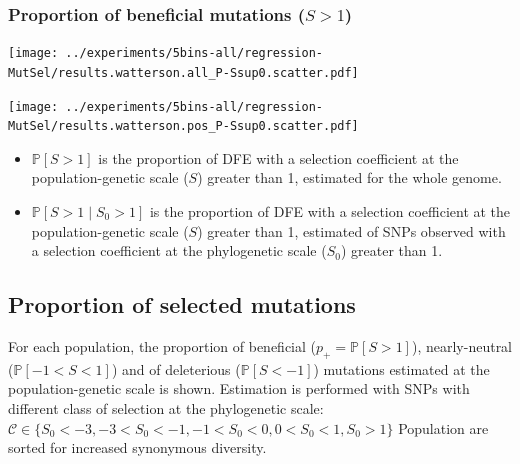 \documentclass{article}
\newcommand{\proba}{\mathbb{P}}
\newcommand{\Sphy}{S_{0}}
\newcommand{\Sphyclass}{\mathcal{C}}
\newcommand{\divStrongDel}{\Sphy < -3}
\newcommand{\divDel}{-3 < \Sphy < -1}
\newcommand{\divWeakDel}{-1 < \Sphy < 0}
\newcommand{\divWeakAdv}{0 < \Sphy < 1}
\newcommand{\divAdv}{ \Sphy > 1}
\newcommand{\given}{\mid}
\newcommand{\Spop}{S}
\newcommand{\polyDel}{\Spop < -1}
\newcommand{\polyNeutral}{-1 < \Spop < 1}
\newcommand{\polyAdv}{ \Spop > 1}
\newcommand{\PpolyDel}{\proba \left[ \polyDel \right]}
\newcommand{\PpolyNeutral}{\proba \left[ \polyNeutral \right]}
\newcommand{\PpolyAdv}{\proba \left[ \polyAdv \right]}
\begin{document}
    \subsubsection{Proportion of beneficial mutations ($\polyAdv$)}\label{subsec:proportion-beneficial-mutations}
    \begin{minipage}{0.32\linewidth}
        \texttt{[image: ../experiments/5bins-all/regression-MutSel/results.watterson.all\_P-Ssup0.scatter.pdf]}
    \end{minipage}
    \begin{minipage}{0.32\linewidth}
        \texttt{[image: ../experiments/5bins-all/regression-MutSel/results.watterson.pos\_P-Ssup0.scatter.pdf]}
    \end{minipage}
    \begin{itemize}
        \item $ \proba [ \polyAdv ]$ is the proportion of DFE with a selection coefficient at the population-genetic scale ($\Spop$) greater than 1, estimated for the whole genome.
        \item $\proba [ \polyAdv \given \divAdv] $ is the proportion of DFE with a selection coefficient at the population-genetic scale ($\Spop$) greater than 1, estimated of SNPs observed with a selection coefficient at the phylogenetic scale ($\Sphy$) greater than 1.
    \end{itemize}

    \newpage

    \subsection{Proportion of selected mutations}

    For each population, the proportion of beneficial ($p_+=\PpolyAdv$), nearly-neutral ($\PpolyNeutral$) and of deleterious ($\PpolyDel$) mutations estimated at the population-genetic scale is shown.
    Estimation is performed with SNPs with different class of selection at the phylogenetic scale: $\Sphyclass \in \{ \divStrongDel, \divDel, \divWeakDel, \divWeakAdv, \divAdv \}$
    Population are sorted for increased synonymous diversity.
\end{document}
